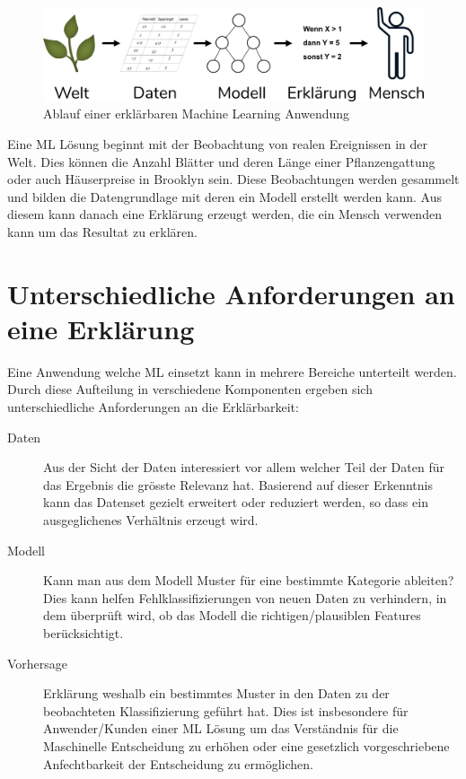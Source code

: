 \documentclass[
  12pt, %
  a4paper, %
  oneside, %
  openany, 
  numbers=noenddot, %
  BCOR=5mm, %
  parskip=half*, %
  thesis, %
]{bfhbook}
\begin{document}
\begin{figure}[ht]
\centering
\includegraphics[width=\textwidth]{Bilder/Explanation-Flow.png}
\caption{Ablauf einer erklärbaren Machine Learning Anwendung}
\end{figure}

Eine \Gls{ML} Lösung beginnt mit der Beobachtung von realen Ereignissen in der Welt. Dies können die Anzahl Blätter und deren Länge einer Pflanzengattung oder auch Häuserpreise in Brooklyn sein. Diese Beobachtungen werden gesammelt und bilden die Datengrundlage mit deren ein Modell erstellt werden kann. Aus diesem kann danach eine Erklärung erzeugt werden, die ein Mensch verwenden kann um das Resultat zu erklären.

\section{Unterschiedliche Anforderungen an eine Erklärung}
Eine Anwendung welche \Gls{ML} einsetzt kann in mehrere Bereiche unterteilt werden.  Durch diese Aufteilung in verschiedene  Komponenten ergeben sich unterschiedliche Anforderungen an die Erklärbarkeit: \parencite{XAI2018}

\begin{description}
\item[Daten]
Aus der Sicht der Daten interessiert vor allem welcher Teil der Daten für das Ergebnis die grösste Relevanz hat. Basierend auf dieser Erkenntnis kann das Datenset gezielt erweitert oder reduziert werden, so dass ein ausgeglichenes Verhältnis erzeugt wird.

\item[Modell]
Kann man aus dem Modell Muster für eine bestimmte Kategorie ableiten? Dies kann helfen Fehlklassifizierungen von neuen Daten zu verhindern, in dem überprüft wird, ob das Modell die richtigen/plausiblen Features berücksichtigt.

\item[Vorhersage]
Erklärung weshalb ein bestimmtes Muster in den Daten zu der beobachteten Klassifizierung geführt hat. Dies ist insbesondere für Anwender/Kunden einer ML Lösung um das Verständnis für die Maschinelle Entscheidung zu erhöhen oder eine gesetzlich vorgeschriebene Anfechtbarkeit der Entscheidung zu ermöglichen.
\end{description}
\end{document}
